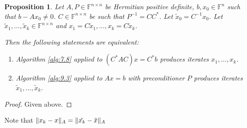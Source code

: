 \documentclass[12pt]{article}
\newtheorem{proposition}[theorem]{Proposition}
\theoremstyle{definition}
\theoremstyle{remark}
\numberwithin{equation}{section}
\newcommand{\F}{\mathbb{F}}
\DeclarePairedDelimiter{\norm}{\lVert}{\rVert}
\begin{document}
\begin{proposition}
  \label{prop:9.4}
  Let $A, P \in \F^{n\times n}$ be Hermitian positive definite, $b, x_0 \in \F^n$ such that $b - Ax_0 \neq 0$. $C \in \F^{n\times n}$ be such that $P^{-1} = CC^*$. Let $\tilde{x}_0 = C^{-1} x_0$. Let $\tilde{x}_1, \ldots, \tilde{x}_k \in \F^{n\times n}$ and $x_1 = C \tilde{x}_1, \ldots, x_k = C \tilde{x}_k$.

  Then the following statements are equivalent:
  \begin{enumerate}[label=(\roman*)]
    \item Algorithm \ref{alg:7.8} applied to $(C^* A C)x = C^* b$ produces iterates $x_1, \ldots, x_k$.
    \item Algorithm \ref{alg:9.3} applied to $Ax = b$ with preconditioner $P$ produces iterates $\tilde{x}_1, \ldots, \tilde{x}_k$.
  \end{enumerate}
\end{proposition}
\begin{proof}
  Given above.
\end{proof}

Note that $\norm{x_k - x}_A = \norm{\tilde{x_k} - \tilde{x}}_A$
\end{document}
